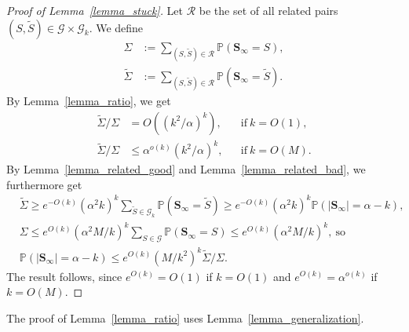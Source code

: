 \documentclass{article}
\theoremstyle{plain}
\theoremstyle{remark}
\theoremstyle{plain}
\numberwithin{equation}{section}
\begin{document}
	\begin{proof}[Proof of Lemma~\ref{lemma_stuck}]
		Let $\mathcal{R}$ be the set of all related pairs $(S,\widetilde{S})\in\mathcal{G}\times\mathcal{G}_k$. We define
		\begin{align}
			\Sigma&:=\sum_{(S,\widetilde{S})\in\mathcal{R}}\mathbb{P}(\boldsymbol{S}_{\infty}=S),
			\\\widetilde{\Sigma}&:=\sum_{(S,\widetilde{S})\in\mathcal{R}}\mathbb{P}(\boldsymbol{S}_{\infty}=\widetilde{S}).
		\end{align}
		By Lemma~\ref{lemma_ratio}, we get
		\begin{align}
			\widetilde{\Sigma}/\Sigma&=O((k^2/\alpha)^k),&&\mbox{if}\ k=O(1),
			\\\widetilde{\Sigma}/\Sigma&\leq\alpha^{o(k)}(k^2/\alpha)^k,&&\mbox{if}\ k=O(M).
		\end{align}
		By Lemma~\ref{lemma_related_good} and Lemma~\ref{lemma_related_bad}, we furthermore get
		\begin{align}
			&\widetilde{\Sigma}\geq e^{-O(k)}(\alpha^2k)^k\sum_{\widetilde{S}\in\mathcal{G}_k}\mathbb{P}(\boldsymbol{S}_{\infty}=\widetilde{S})\geq e^{-O(k)}(\alpha^2k)^k\mathbb{P}(|\boldsymbol{S}_{\infty}|=\alpha-k),
			\\&\Sigma\leq e^{O(k)}(\alpha^2M/k)^k\sum_{S\in\mathcal{G}}\mathbb{P}(\boldsymbol{S}_{\infty}=S)\leq e^{O(k)}(\alpha^2M/k)^k,\ \text{so}
			\\&\mathbb{P}(|\boldsymbol{S}_{\infty}|=\alpha-k)\leq e^{O(k)}(M/k^2)^{k}\widetilde{\Sigma}/\Sigma.
		\end{align}
		The result follows, since $e^{O(k)}=O(1)$ if $k=O(1)$ and $e^{O(k)}=\alpha^{o(k)}$ if $k=O(M)$.
	\end{proof}
	
	The proof of Lemma~\ref{lemma_ratio} uses Lemma~\ref{lemma_generalization}.
	
\end{document}
